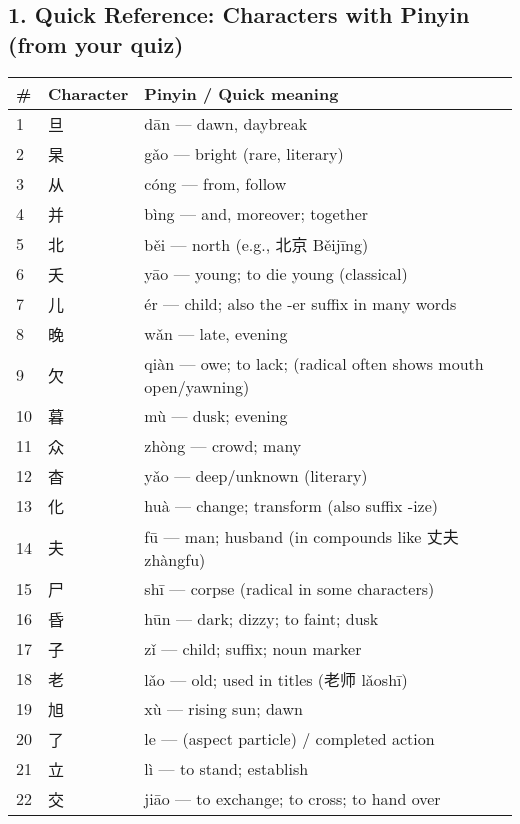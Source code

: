 \begin{CJK}{UTF8}{gbsn}

\section*{1. Quick Reference: Characters with Pinyin (from your quiz)}
\begin{longtable}{lll}
\toprule
\# & Character & Pinyin / Quick meaning \\
\midrule
1 & 旦 & dān — dawn, daybreak \\
2 & 杲 & gǎo — bright (rare, literary) \\
3 & 从 & cóng — from, follow \\
4 & 并 & bìng — and, moreover; together \\
5 & 北 & běi — north (e.g., 北京 Běijīng) \\
6 & 夭 & yāo — young; to die young (classical) \\
7 & 儿 & ér — child; also the -er suffix in many words \\
8 & 晚 & wǎn — late, evening \\
9 & 欠 & qiàn — owe; to lack; (radical often shows mouth open/yawning) \\
10 & 暮 & mù — dusk; evening \\
11 & 众 & zhòng — crowd; many \\
12 & 杳 & yǎo — deep/unknown (literary) \\
13 & 化 & huà — change; transform (also suffix -ize) \\
14 & 夫 & fū — man; husband (in compounds like 丈夫 zhàngfu) \\
15 & 尸 & shī — corpse (radical in some characters) \\
16 & 昏 & hūn — dark; dizzy; to faint; dusk \\
17 & 子 & zǐ — child; suffix; noun marker \\
18 & 老 & lǎo — old; used in titles (老师 lǎoshī) \\
19 & 旭 & xù — rising sun; dawn \\
20 & 了 & le — (aspect particle) / completed action \\
21 & 立 & lì — to stand; establish \\
22 & 交 & jiāo — to exchange; to cross; to hand over \\

\end{longtable}
\end{CJK}
